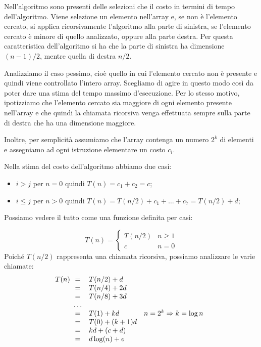 Nell'algoritmo sono presenti delle selezioni che  il costo in
termini di tempo dell'algoritmo. Viene selezione un elemento 
nell'array e, se non è l'elemento cercato, si applica ricorsivamente l'algoritmo
alla parte di sinistra, se l'elemento cercato è minore di quello analizzato,
oppure alla parte destra. Per questa caratteristica dell'algoritmo si ha che la
parte di sinistra ha dimensione $(n-1)/2$, mentre quella di destra $n/2$.

\bigskip\noindent
Analizziamo il caso pessimo, cioè quello in cui l'elemento cercato non è presente
e quindi viene controllato l'intero array. Scegliamo di agire in questo modo così
da poter dare una stima del tempo massimo d'esecuzione. Per lo stesso motivo,
ipotizziamo che l'elemento cercato sia maggiore di ogni elemento presente
nell'array e che quindi la chiamata ricorsiva venga effettuata sempre sulla parte
di destra che ha una dimensione maggiore.

Inoltre, per semplicità assumiamo che l'array contenga un numero $2^k$ di
elementi e assegniamo ad ogni istruzione elementare un costo $c_i$.

\bigskip\noindent
Nella stima del costo dell'algoritmo abbiamo due casi:
\begin{itemize}
    \item $i > j$ per $n = 0$ quindi $T(n) = c_1 + c_2 = c$;
    \item $i\leq j$ per $n > 0$ quindi $T(n) = T(n/2)+c_1+\dots+c_7=
    T(n/2) + d$;
\end{itemize}
Possiamo vedere il tutto come una funzione definita per casi:

\[T(n)=\begin{cases}
    T(n/2) & n\geq 1\\
    c & n = 0
\end{cases}\]
Poiché $T(n/2)$ rappresenta una chiamata ricorsiva, possiamo analizzare le varie
chiamate:
\[T(n)\begin{array}[t]{cll}
    = & T(n/2)+d\\
    = & T(n/4)+2d\\
    = & T(n/8)+3d\\
    \dots\\
    = & T(1)+kd & n=2^k\Rightarrow k=\log n\\
    = & T(0)+(k+1)d\\
    = & kd+(c+d)\\
    = & d\log(n)+e
\end{array}\]

